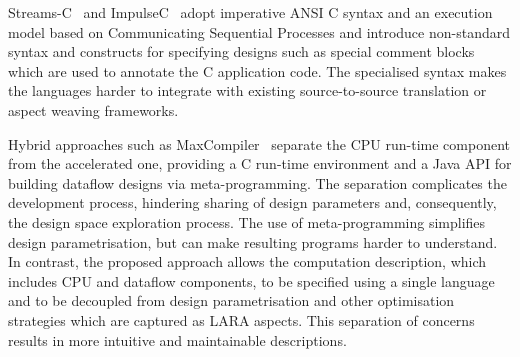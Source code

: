 Streams-C~\cite{Gokhale:Stone:Arnold:Kalinowski:2000} and
ImpulseC~\cite{ImpulseC} adopt imperative ANSI C syntax and an
execution model based on Communicating Sequential Processes and
introduce non-standard syntax and constructs for specifying designs
such as special comment blocks which are used to annotate the C
application code. The specialised syntax makes the languages harder to
integrate with existing source-to-source translation or aspect weaving
frameworks.

Hybrid approaches such as MaxCompiler~\cite{5719584} separate the CPU
run-time component from the accelerated one, providing a C run-time
environment and a Java API for building dataflow designs via
meta-programming. The separation complicates the development process,
hindering sharing of design parameters and, consequently, the design
space exploration process. The use of meta-programming simplifies
design parametrisation, but can make resulting programs harder to
understand. In contrast, the proposed approach allows the computation
description, which includes CPU and dataflow components, to be specified
using a single language and to be decoupled from design
parametrisation and other optimisation strategies which are captured
as LARA aspects. This separation of concerns results in more intuitive
and maintainable descriptions.


